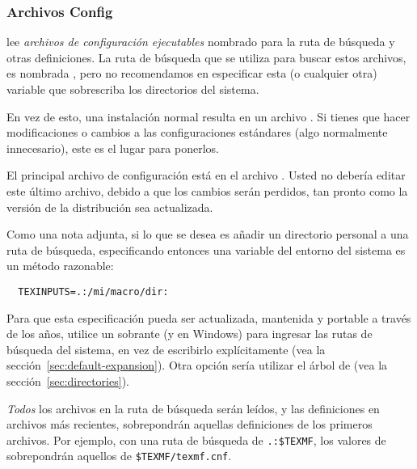 \documentclass{article}
\begin{document}
\subsubsection{Archivos Config}

\KPS{} lee \emph{archivos de configuración ejecutables} nombrado
 para la ruta de búsqueda y otras definiciones. La ruta
de búsqueda que se utiliza para buscar estos archivos, es nombrada
, pero no recomendamos en especificar esta (o
cualquier otra) variable que sobrescriba los directorios del sistema. 

En vez de esto, una instalación normal resulta en un archivo
. Si tienes que hacer modificaciones o
cambios a las configuraciones estándares (algo normalmente
innecesario), este es el lugar para ponerlos.

El principal archivo de configuración está en el archivo
.  Usted no debería editar
este último archivo, debido a que los cambios serán perdidos,
tan pronto como la versión de la distribución sea actualizada.

Como una nota adjunta, si lo que se desea es añadir un directorio personal a una ruta de búsqueda, especificando entonces una variable del entorno del sistema es un método razonable:
\begin{verbatim}
  TEXINPUTS=.:/mi/macro/dir:
\end{verbatim}
Para que esta especificación pueda ser actualizada, mantenida y portable a través de los años, utilice un sobrante \samp{:} (y \samp{;} en Windows) para ingresar las rutas de búsqueda del sistema, en vez de escribirlo explícitamente (vea la sección~\ref{sec:default-expansion}). Otra opción sería utilizar el árbol de  (vea la sección~\ref{sec:directories}).



\emph{Todos} los archivos  en la ruta de
búsqueda serán leídos, y las definiciones en archivos más
recientes, sobrepondrán aquellas definiciones de los primeros archivos. Por
ejemplo, con una ruta de búsqueda de \verb|.:$TEXMF|, los
valores de  sobrepondrán aquellos de
\verb|$TEXMF/texmf.cnf|.
\end{document}
